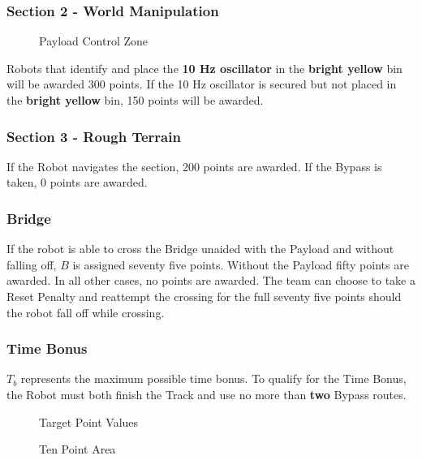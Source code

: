 \subsubsection{Section 2 - World Manipulation}

\begin{figure}[H]
	\centering
	\caption{Payload Control Zone}
	\label{fig:control_zone} 
\end{figure}

Robots that identify and place the \textbf{10 Hz oscillator} in the \textbf{bright yellow} bin will be awarded 300 points. If the 10 Hz oscillator is secured but not placed in the \textbf{bright yellow} bin, 150 points will be awarded. 

\subsubsection{Section 3 - Rough Terrain}
If the Robot navigates the section, 200 points are awarded. If the Bypass is taken, 0 points are awarded.

\subsubsection{Bridge}
If the robot is able to cross the Bridge unaided with the Payload and without falling off, $B$ is assigned seventy five points. Without the Payload fifty points are awarded. In all other cases, no points are awarded. The team can choose to take a Reset Penalty and reattempt the crossing for the full seventy five points should the robot fall off while crossing.

\subsubsection{Time Bonus}
$T_b$ represents the maximum possible time bonus. To qualify for the Time Bonus, the Robot must both finish the Track and use no more than \textbf{two} Bypass routes.

\begin{figure}[H]
	\centering
	\caption{Target Point Values}
	\label{fig:target} 
\end{figure}

\begin{figure}[H]
	\centering
	\caption{Ten Point Area}
	\label{fig:10pts_zone} 
\end{figure}

